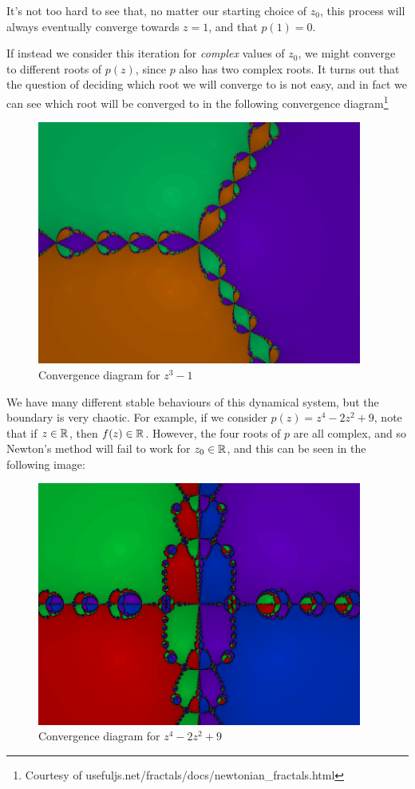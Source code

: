 \documentclass[10pt,a4paper]{article}
\begin{document}
It's not too hard to see that, no matter our starting choice of $z_0$, this process will always eventually converge towards $z=1$, and that $p(1) = 0$.

If instead we consider this iteration for \emph{complex} values of $z_0$, we might converge to different roots of $p(z)$, since $p$ also has two complex roots. It turns out that the question of deciding which root we will converge to is not easy, and in fact we can see which root will be converged to in the following convergence diagram\footnote{Courtesy of usefuljs.net/fractals/docs/newtonian\_fractals.html}
\begin{figure}[H]
  \centering
  \includegraphics[width=0.95\textwidth]{compdyn01.png}
  \caption{Convergence diagram for $z^3-1$}
\end{figure}

We have many different stable behaviours of this dynamical system, but the boundary is very chaotic. For example, if we consider $p(z) = z^4-2z^2+9$, note that if $z \in \mathbb{R}$, then $f(z) \in \mathbb{R}$. However, the four roots of $p$ are all complex, and so Newton's method will fail to work for $z_0 \in \mathbb{R}$, and this can be seen in the following image:
\begin{figure}[H]
  \centering
  \includegraphics[width=0.95\textwidth]{compdyn02.png}
  \caption{Convergence diagram for $z^4-2z^2+9$}
\end{figure}
\end{document}
